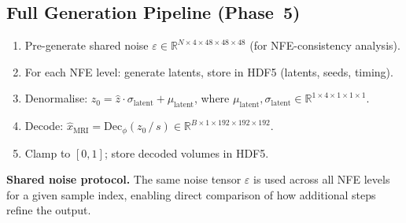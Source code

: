 \subsection{Full Generation Pipeline (Phase~5)}

\begin{enumerate}[nosep]
  \item Pre-generate shared noise $\varepsilon \in \mathbb{R}^{N \times 4 \times 48 \times 48 \times 48}$ (for NFE-consistency analysis).
  \item For each NFE level: generate latents, store in HDF5 (latents, seeds,
        timing).
  \item Denormalise: $z_0 = \hat{z}\cdot\sigma_{\mathrm{latent}}
                           + \mu_{\mathrm{latent}}$,
    where $\mu_\mathrm{latent}, \sigma_\mathrm{latent} \in \mathbb{R}^{1 \times 4 \times 1 \times 1 \times 1}$.
  \item Decode: $\hat{x}_\mathrm{MRI} = \mathrm{Dec}_\phi(z_0\,/\,s)
    \in \mathbb{R}^{B \times 1 \times 192 \times 192 \times 192}$.
  \item Clamp to $[0,1]$; store decoded volumes in HDF5.
\end{enumerate}

\textbf{Shared noise protocol.}  The same noise tensor $\varepsilon$ is used
across all NFE levels for a given sample index, enabling direct comparison of
how additional steps refine the output.
